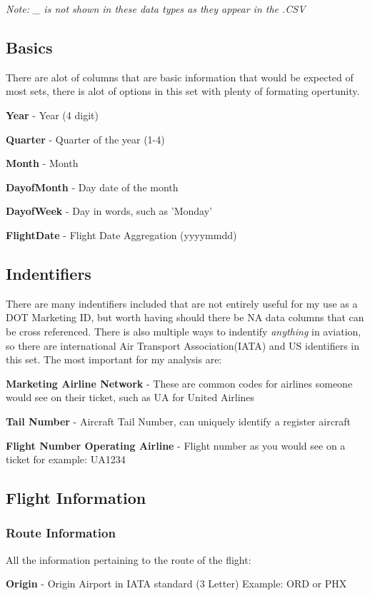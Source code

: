 \documentclass[a4paper,11pt]{article}
\begin{document}
\emph{Note: \_ is not shown in these data types as they appear in the .CSV}

\subsection{Basics}
There are alot of columns that are basic information that would be expected of most sets, there is alot of options in this set with plenty of formating opertunity.

\textbf{Year} - Year (4 digit)

\textbf{Quarter} - Quarter of the year (1-4)

\textbf{Month} - Month

\textbf{DayofMonth} - Day date of the month

\textbf{DayofWeek} - Day in words, such as 'Monday'

\textbf{FlightDate} - Flight Date Aggregation (yyyymmdd)

\subsection{Indentifiers}
There are many indentifiers included that are not entirely useful for my use as a DOT Marketing ID, but worth having should there be NA data columns that can be cross referenced.
There is also multiple ways to indentify \emph{anything} in aviation, so there are international Air Transport Association(IATA) and US identifiers in this set.
The most important for my analysis are:

\textbf{Marketing Airline Network} - These are common codes for airlines someone would see on their ticket, such as UA for United Airlines 

\textbf{Tail Number} - Aircraft Tail Number, can uniquely identify a register aircraft

\textbf{Flight Number Operating Airline} - Flight number as you would see on a ticket for example: UA1234

\subsection{Flight Information}

\subsubsection{Route Information}
All the information pertaining to the route of the flight:

\textbf{Origin} - Origin Airport in IATA standard (3 Letter) Example: ORD or PHX
\end{document}
